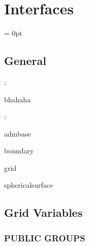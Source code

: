 
\section{Interfaces} 


\parskip = 0pt

\vspace{3mm} \subsection*{General}

: 

bhahaha
\vspace{2mm}

: 

admbase

boundary

grid

sphericalsurface
\vspace{2mm}
\subsection*{Grid Variables}
\vspace{5mm}\subsubsection{PUBLIC GROUPS}

\vspace{5mm}

